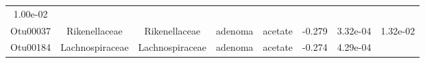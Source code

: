 \documentclass[11pt,]{article}
\begin{document}
\begin{longtable}[]{@{}cccccccc@{}}
\begin{minipage}[t]{0.08\columnwidth}
1.00e-02\strut
\end{minipage}\tabularnewline
\begin{minipage}[t]{0.08\columnwidth}\centering\strut
Otu00037\strut
\end{minipage} & \begin{minipage}[t]{0.15\columnwidth}\centering\strut
Rikenellaceae\strut
\end{minipage} & \begin{minipage}[t]{0.15\columnwidth}\centering\strut
Rikenellaceae\strut
\end{minipage} & \begin{minipage}[t]{0.08\columnwidth}\centering\strut
adenoma\strut
\end{minipage} & \begin{minipage}[t]{0.09\columnwidth}\centering\strut
acetate\strut
\end{minipage} & \begin{minipage}[t]{0.07\columnwidth}\centering\strut
-0.279\strut
\end{minipage} & \begin{minipage}[t]{0.08\columnwidth}\centering\strut
3.32e-04\strut
\end{minipage} & \begin{minipage}[t]{0.08\columnwidth}\centering\strut
1.32e-02\strut
\end{minipage}\tabularnewline
\begin{minipage}[t]{0.08\columnwidth}\centering\strut
Otu00184\strut
\end{minipage} & \begin{minipage}[t]{0.15\columnwidth}\centering\strut
Lachnospiraceae\strut
\end{minipage} & \begin{minipage}[t]{0.15\columnwidth}\centering\strut
Lachnospiraceae\strut
\end{minipage} & \begin{minipage}[t]{0.08\columnwidth}\centering\strut
adenoma\strut
\end{minipage} & \begin{minipage}[t]{0.09\columnwidth}\centering\strut
acetate\strut
\end{minipage} & \begin{minipage}[t]{0.07\columnwidth}\centering\strut
-0.274\strut
\end{minipage} & \begin{minipage}[t]{0.08\columnwidth}\centering\strut
4.29e-04\strut
\end{minipage} & \begin{minipage}[t]{0.08\columnwidth}\centering\strut

\end{minipage}
\end{longtable}
\end{document}
